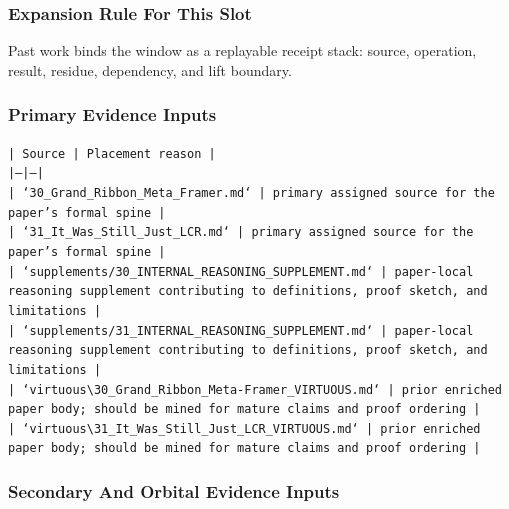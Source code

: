 \documentclass[11pt]{article}
\begin{document}
\subsubsection*{Expansion Rule For This Slot}

Past work binds the window as a replayable receipt stack: source, operation, result, residue, dependency, and lift boundary.

\subsubsection*{Primary Evidence Inputs}

\noindent\texttt{| Source | Placement reason |}\\
\noindent\texttt{|---|---|}\\
\noindent\texttt{| `30\_Grand\_Ribbon\_Meta\_Framer.md` | primary assigned source for the paper's formal spine |}\\
\noindent\texttt{| `31\_It\_Was\_Still\_Just\_LCR.md` | primary assigned source for the paper's formal spine |}\\
\noindent\texttt{| `supplements/30\_INTERNAL\_REASONING\_SUPPLEMENT.md` | paper-local reasoning supplement contributing to definitions, proof sketch, and limitations |}\\
\noindent\texttt{| `supplements/31\_INTERNAL\_REASONING\_SUPPLEMENT.md` | paper-local reasoning supplement contributing to definitions, proof sketch, and limitations |}\\
\noindent\texttt{| `virtuous\textbackslash{}30\_Grand\_Ribbon\_Meta-Framer\_VIRTUOUS.md` | prior enriched paper body; should be mined for mature claims and proof ordering |}\\
\noindent\texttt{| `virtuous\textbackslash{}31\_It\_Was\_Still\_Just\_LCR\_VIRTUOUS.md` | prior enriched paper body; should be mined for mature claims and proof ordering |}\\

\subsubsection*{Secondary And Orbital Evidence Inputs}
\end{document}
